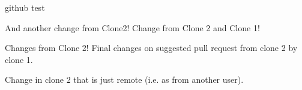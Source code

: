 \documentclass[10pt,a4paper]{report}
\begin{document}
github test

And another change from Clone2!
Change from Clone 2 and Clone 1!

Changes from Clone 2!
Final changes on suggested pull request from clone 2 by clone 1.



Change in clone 2 that is just remote (i.e. as from another user).
\end{document}
